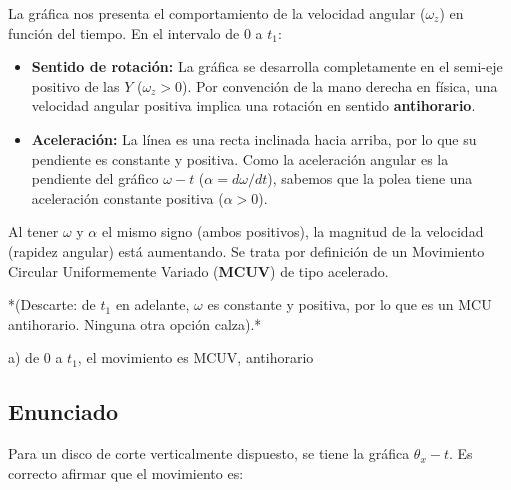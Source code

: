\documentclass[12pt, a4paper]{article}
\begin{document}
La gráfica nos presenta el comportamiento de la velocidad angular ($\omega_z$) en función del tiempo. 
En el intervalo de $0$ a $t_1$:
\begin{itemize}
    \item \textbf{Sentido de rotación:} La gráfica se desarrolla completamente en el semi-eje positivo de las $Y$ ($\omega_z > 0$). Por convención de la mano derecha en física, una velocidad angular positiva implica una rotación en sentido \textbf{antihorario}.
    \item \textbf{Aceleración:} La línea es una recta inclinada hacia arriba, por lo que su pendiente es constante y positiva. Como la aceleración angular es la pendiente del gráfico $\omega-t$ ($\alpha = d\omega/dt$), sabemos que la polea tiene una aceleración constante positiva ($\alpha > 0$).
\end{itemize}
Al tener $\omega$ y $\alpha$ el mismo signo (ambos positivos), la magnitud de la velocidad (rapidez angular) está aumentando. Se trata por definición de un Movimiento Circular Uniformemente Variado (\textbf{MCUV}) de tipo acelerado. 

*(Descarte: de $t_1$ en adelante, $\omega$ es constante y positiva, por lo que es un MCU antihorario. Ninguna otra opción calza).*

\begin{tcolorbox}[colback=green!5!white, colframe=green!50!black, title=Respuesta Final]
\centering \Large a) de $0$ a $t_1$, el movimiento es MCUV, antihorario
\end{tcolorbox}

\newpage

\subsection*{Enunciado}
Para un disco de corte verticalmente dispuesto, se tiene la gráfica $\theta_x - t$. Es correcto afirmar que el movimiento es:

\begin{center}
\end{center}
\end{document}
